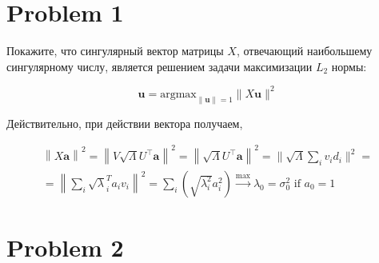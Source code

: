 \documentclass[12pt,letterpaper]{article}
\begin{document}
\section*{Problem 1}

Покажите, что сингулярный вектор матрицы $X$, отвечающий наибольшему сингулярному числу, является решением
задачи максимизации $L_2$ нормы:

$$
	\mathbf{u} = \text{argmax}_{\| \mathbf{u} \| = 1} \| X \mathbf{u} \|^{2}
$$

Действительно, при действии вектора получаем,

\begin{align*}
	\left\|X \mathbf{a} \right\|^{2}=\left\|V \sqrt{\Lambda} U^{\top} \mathbf{a}\right\|^{2}=\left\|\sqrt{\Lambda} U^{\top} \mathbf{a} \right\|^{2}=\| \sqrt{\Lambda} \sum_{i} v_{i} d_{i} \|^{2}=\\
	=\left\|\sum_{i} \sqrt{\lambda}_{i}^{T} a_{i} v_{i}\right\|^{2}=\sum_{i}\left(\sqrt{\lambda_{i}^{2}} a_{i}^{2}\right) \xrightarrow{\max} \lambda_{0} = \sigma_{0}^{2} \text { if } a_{0}=1
\end{align*}

	

%
%
%
%     
%    
%     
%


\section*{Problem 2}
\end{document}
